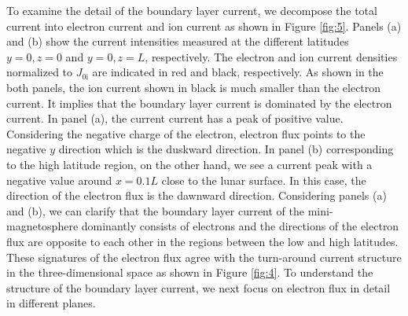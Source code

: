 \documentclass[draft,jgrga]{agutex2015}
\begin{document}
\begin{article}
To examine the detail of the boundary layer current, 
we decompose the total current into electron current 
and ion current as shown in Figure \ref{fig:5}. 
Panels (a) and (b) show the current intensities 
measured at the different latitudes $y=0, z=0$ and $y=0, z=L$, respectively.
The electron and ion current densities normalized to $J_\mathrm{0i}$ are 
indicated in red and black, respectively. 
As shown in the both panels, 
the ion current shown in black is much smaller than the electron current. 
It implies that the boundary layer current is dominated by the electron current. 
In panel (a), 
the current current has a peak of positive value. 
Considering the negative charge of the electron, 
electron flux points to the negative $y$ direction which is the duskward direction. 
In panel (b) corresponding to the high latitude region, on the other hand,  
we see a current peak with a negative value around $x=0.1L$ close to the lunar surface. 
In this case, the direction of the electron flux is the dawnward direction.  
Considering panels (a) and (b), we can clarify that the boundary layer current 
of the mini-magnetosphere dominantly consists of electrons and 
the directions of the electron flux are opposite to each other 
in the regions between the low and high latitudes. 
These signatures of the electron flux agree with the
turn-around current structure in the three-dimensional space 
as shown in Figure \ref{fig:4}.
To understand the structure of the boundary layer current, 
we next focus on electron flux in detail in different planes.



\end{article}
\end{document}
